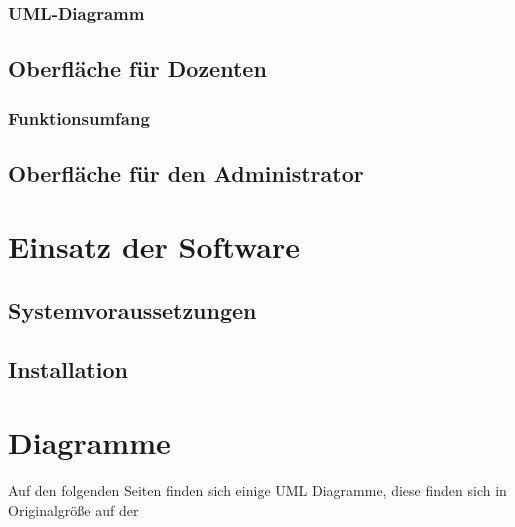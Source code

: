 \documentclass[12pt,a4paper,parskip]{scrreprt}
\begin{document}
\subsection{UML-Diagramm}
\section{Oberfläche für Dozenten}
\subsection{Funktionsumfang}
\section{Oberfläche für den Administrator}
\chapter{Einsatz der Software}
\section{Systemvoraussetzungen}
\section{Installation}
\chapter{Diagramme}
Auf den folgenden Seiten finden sich einige UML Diagramme, diese finden sich in Originalgröße auf der 
\end{document}

